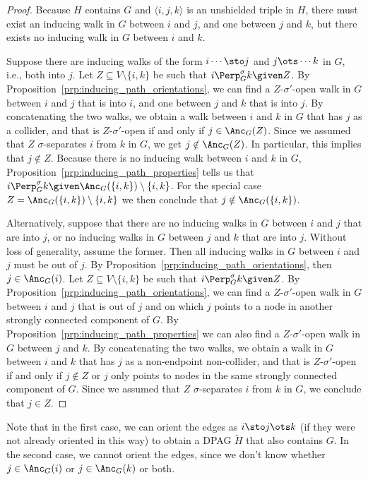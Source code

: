 \begin{proof}
  Because $H$ contains $G$ and $\langle i,j,k \rangle$ is an unshielded triple in $H$, there must exist an inducing walk in $G$ between $i$ and $j$, and one between $j$ and $k$, but there exists no inducing walk in $G$ between $i$ and $k$.

  Suppose there are inducing walks of the form $i \cdots \sto j$ and $j \ots \cdots k$ in $G$, i.e., both into $j$. 
  Let $Z \subseteq V \setminus \{i,k\}$ be such that $i \Perp^\sigma_G k \given Z$.
  By Proposition~\ref{prp:inducing_path_orientations}, we can find a $Z$-$\sigma'$-open walk in $G$ between $i$ and $j$ that is into $i$, and one between $j$ and $k$ that is into $j$.
  By concatenating the two walks, we obtain a walk between $i$ and $k$ in $G$ that has $j$ as a collider, and that is $Z$-$\sigma'$-open if and only if $j \in \Anc_G(Z)$.
  Since we assumed that $Z$ $\sigma$-separates $i$ from $k$ in $G$, we get $j \notin \Anc_G(Z)$.
  In particular, this implies that $j \notin Z$.
  Because there is no inducing walk between $i$ and $k$ in $G$, Proposition~\ref{prp:inducing_path_properties} tells us that $i \Perp^\sigma_G k \given \Anc_G(\{i,k\}) \setminus \{i,k\}$.
  For the special case $Z = \Anc_G(\{i,k\}) \setminus \{i,k\}$ we then conclude that $j \notin \Anc_G(\{i,k\})$.

  Alternatively, suppose that there are no inducing walks in $G$ between $i$ and $j$ that are into $j$, or no inducing walks in $G$ between $j$ and $k$ that are into $j$.
  Without loss of generality, assume the former.
  Then all inducing walks in $G$ between $i$ and $j$ must be out of $j$.
  By Proposition~\ref{prp:inducing_path_orientations}, then $j \in \Anc_G(i)$.
  Let $Z \subseteq V \setminus \{i,k\}$ be such that $i \Perp^\sigma_G k \given Z$.
  By Proposition~\ref{prp:inducing_path_orientations}, we can find a $Z$-$\sigma'$-open walk in $G$ between $i$ and $j$ that is out of $j$ and on which $j$ points to a node in another strongly connected component of $G$. 
  By Proposition~\ref{prp:inducing_path_properties} we can also find a $Z$-$\sigma'$-open walk in $G$ between $j$ and $k$.
  By concatenating the two walks, we obtain a walk in $G$ between $i$ and $k$ that has $j$ as a non-endpoint non-collider, and that is $Z$-$\sigma'$-open if and only if $j \notin Z$ or $j$ only points to nodes in the same strongly connected component of $G$.
  Since we assumed that $Z$ $\sigma$-separates $i$ from $k$ in $G$, we conclude that $j \in Z$.
\end{proof}
Note that in the first case, we can orient the edges as $i \sto j \ots k$ (if they were not already oriented in this way) to obtain a DPAG $\tilde{H}$ that also contains $G$. 
In the second case, we cannot orient the edges, since we don't know whether $j \in \Anc_G(i)$ or $j \in \Anc_G(k)$ or both.

